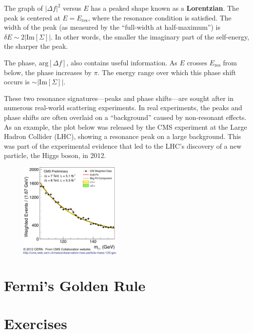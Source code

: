 \documentclass[pra,12pt]{revtex4}
\begin{document}
The graph of $|\Delta f|^2$ versus $E$ has a peaked shape known as a
\textbf{Lorentzian}.  The peak is centered at $E = E_{\mathrm{res}}$,
where the resonance condition is satisfied.  The width of the peak (as
measured by the ``full-width at half-maximum'') is $\delta E \sim
2|\mathrm{Im}[\Sigma]|$.  In other words, the smaller the imaginary
part of the self-energy, the sharper the peak.

The phase, $\mathrm{arg}[\Delta f]$, also contains useful information.
As $E$ crosses $E_{\mathrm{res}}$ from below, the phase increases by
$\pi$.  The energy range over which this phase shift occurs is $\sim
|\mathrm{Im}[\Sigma]|$.

These two resonance signatures---peaks and phase shifts---are sought
after in numerous real-world scattering experiments.  In real
experiments, the peaks and phase shifts are often overlaid on a
``background'' caused by non-resonant effects.  As an example, the
plot below was released by the CMS experiment at the Large Hadron
Collider (LHC), showing a resonance peak on a large background.  This
was part of the experimental evidence that led to the LHC's discovery
of a new particle, the Higgs boson, in 2012.

\begin{figure}[h]
  \centering\includegraphics[width=0.45\textwidth]{higgs}
\end{figure}


\section{Fermi's Golden Rule}


\section*{Exercises}
\end{document}
